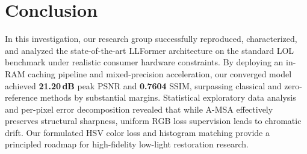 \documentclass[conference]{IEEEtran}
\begin{document}
\section{Conclusion}
\label{sec:conclusion}

In this investigation, our research group successfully reproduced, characterized, and analyzed the state-of-the-art LLFormer architecture on the standard LOL benchmark under realistic consumer hardware constraints. By deploying an in-RAM caching pipeline and mixed-precision acceleration, our converged model achieved \textbf{21.20\,dB} peak PSNR and \textbf{0.7604} SSIM, surpassing classical and zero-reference methods by substantial margins. Statistical exploratory data analysis and per-pixel error decomposition revealed that while A-MSA effectively preserves structural sharpness, uniform RGB loss supervision leads to chromatic drift. Our formulated HSV color loss and histogram matching provide a principled roadmap for high-fidelity low-light restoration research.

\balance
\end{document}
